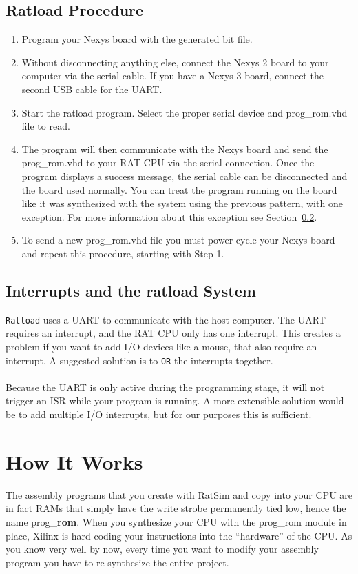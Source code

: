 \documentclass[notitlepage]{article}
\begin{document}
\subsection{Ratload Procedure}
\begin{enumerate}
\item Program your Nexys board with the generated bit file.

\item Without disconnecting anything else, connect the Nexys 2 board to your computer via the serial cable. If you have a Nexys 3 board, connect the second USB cable for the UART.

\item Start the ratload program. Select the proper serial device and prog\_rom.vhd file to read.

\item The program will then communicate with the Nexys board and send the prog\_rom.vhd to your RAT CPU via the serial connection. Once the program displays a success message, the serial cable can be disconnected and the board used normally. You can treat the program running on the board like it was synthesized with the system using the previous pattern, with one exception. For more information about this exception see Section~\ref{sec:interrupts}.

\item To send a new prog\_rom.vhd file you must power cycle your Nexys board and repeat this procedure, starting with Step 1.
\end{enumerate}

\subsection{Interrupts and the ratload System}
\label{sec:interrupts}
\texttt{Ratload} uses a UART to communicate with the host computer. The UART requires an interrupt, and the RAT CPU only has one interrupt. This creates a problem if you want to add I/O devices like a mouse, that also require an interrupt. A suggested solution is to \texttt{OR} the interrupts together.\\\\
Because the UART is only active during the programming stage, it will not trigger an ISR while your program is running. A more extensible solution would be to add multiple I/O interrupts, but for our purposes this is sufficient.

\section{How It Works}
The assembly programs that you create with RatSim and copy into your CPU are in fact RAMs that simply have the write strobe permanently tied low, hence the name prog\_\textbf{rom}. When you synthesize your CPU with the prog\_rom module in place, Xilinx is hard-coding your instructions into the ``hardware'' of the CPU. As you know very well by now, every time you want to modify your assembly program you have to re-synthesize the entire project.
\end{document}
